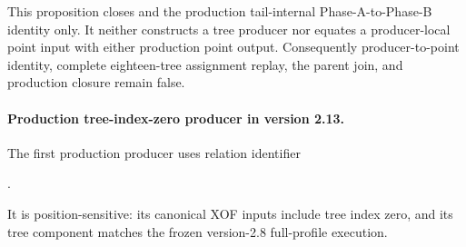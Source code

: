 \documentclass[11pt]{article}
\begin{document}
This proposition closes
 and the production tail-internal
Phase-A-to-Phase-B identity only.  It neither constructs a tree producer nor
equates a producer-local point input with either production point output.
Consequently producer-to-point identity, complete eighteen-tree assignment
replay, the parent join, and production closure remain false.

\paragraph{Production tree-index-zero producer in version 2.13.}
The first production producer uses relation identifier
\begin{center}\small
{}.
\end{center}
It is position-sensitive: its canonical XOF inputs include tree index zero,
and its tree component matches the frozen version-2.8 full-profile execution.
\end{document}

